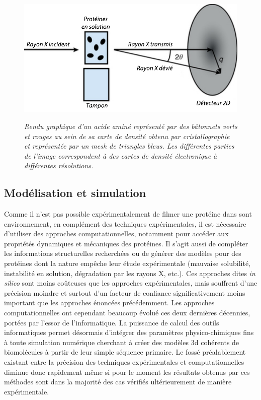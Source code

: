\begin{figure}
  \centering
  {\includegraphics[width=0.75\linewidth]{./figures/ch1/saxs.pdf}}
    \caption{\it Rendu graphique d'un acide aminé représenté par des bâtonnets verts et rouges au sein de sa carte de densité obtenu par cristallographie et représentée par un mesh de triangles bleus. Les différentes parties de l'image correspondent à des cartes de densité électronique à différentes résolutions.}
    \label{Fig:saxs}
  \hspace{0.3cm}
\end{figure}


\subsection{Modélisation et simulation}

Comme il n'est pas possible expérimentalement de filmer une protéine dans sont environnement, en complément des techniques expérimentales, il est nécessaire d'utiliser des approches computationnelles, notamment pour accéder aux propriétés dynamiques et mécaniques des protéines. Il s'agit aussi de compléter les informations structurelles recherchées ou de générer des modèles pour des protéines dont la nature empêche leur étude expérimentale (mauvaise solubilité, instabilité en solution, dégradation par les rayons X, etc.). Ces approches dites \textit{in silico} sont moins coûteuses que les approches expérimentales, mais souffrent d'une précision moindre et surtout d'un facteur de confiance significativement moins important que les approches énoncées précédemment. Les approches computationnelles ont cependant beaucoup évolué ces deux dernières décennies, portées par l'essor de l'informatique. La puissance de calcul des outils informatiques permet désormais d'intégrer des paramètres physico-chimiques fins à toute simulation numérique cherchant à créer des modèles 3d cohérents de biomolécules à partir de leur simple séquence primaire. Le fossé préalablement existant entre la précision des techniques expérimentales et computationnelles diminue donc rapidement même si pour le moment les résultats obtenus par ces méthodes sont dans la majorité des cas vérifiés ultérieurement de manière expérimentale.

